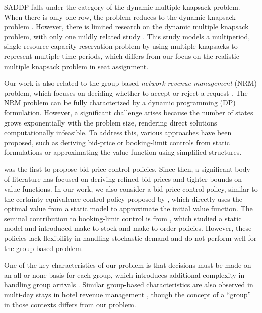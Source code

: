 
SADDP falls under the category of the dynamic multiple knapsack problem. When there is only one row, the problem reduces to the dynamic knapsack problem \citep{kleywegt1998dynamic}. However, there is limited research on the dynamic multiple knapsack problem, with only one mildly related study \citep{perry2009approximate}. This study models a multiperiod, single-resource capacity reservation problem by using multiple knapsacks to represent multiple time periods, which differs from our focus on the realistic multiple knapsack problem in seat assignment.

Our work is also related to the group-based \textit{network revenue management} (NRM) problem, which focuses on deciding whether to accept or reject a request \citep{gallego1997multiproduct}. The NRM problem can be fully characterized by a dynamic programming (DP) formulation. However, a significant challenge arises because the number of states grows exponentially with the problem size, rendering direct solutions computationally infeasible. To address this, various approaches have been proposed, such as deriving bid-price or booking-limit controls from static formulations or approximating the value function using simplified structures.

\citet{talluri1998analysis} was the first to propose bid-price control policies. Since then, a significant body of literature has focused on deriving refined bid prices and tighter bounds on value functions. In our work, we also consider a bid-price control policy, similar to the certainty equivalence control policy proposed by \citet{bertsimas2003revenue}, which directly uses the optimal value from a static model to approximate the initial value function. The seminal contribution to booking-limit control is from \citet{gallego1997multiproduct}, which studied a static model and introduced make-to-stock and make-to-order policies. However, these policies lack flexibility in handling stochastic demand and do not perform well for the group-based problem.


One of the key characteristics of our problem is that decisions must be made on an all-or-none basis for each group, which introduces additional complexity in handling group arrivals \citep{talluri2006theory}. Similar group-based characteristics are also observed in multi-day stays in hotel revenue management \citep{aydin2018decomposition, bitran1995application}, though the concept of a ``group'' in those contexts differs from our problem.

